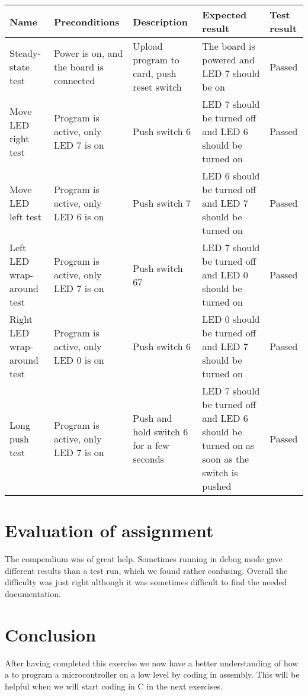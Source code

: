 \documentclass[a4paper,11pt]{article}
\begin{document}
\renewcommand{\arraystretch}{1.25} %
\begin{tabular}[pos]{|m{70pt}|m{90pt}|m{90pt}|m{100pt}|m{60pt}|}
\hline
\textbf{Name} 				& \textbf{Preconditions}				& \textbf{Description} 					& \textbf{Expected result} 													& \textbf{Test result} 		\\ \hline

Steady-state test			& Power is on, and the board is connected & Upload program to card, push reset switch 	& The board is powered and LED 7 should be on 									& Passed 				\\ \hline

Move LED right test			& Program is active, only LED 7 is on 		& Push switch 6						 	& LED 7 should be turned off and LED 6 should be turned on 							& Passed 				\\ \hline

Move LED left test			& Program is active, only LED 6 is on 		& Push switch 7						 	& LED 6 should be turned off and LED 7 should be turned on 							& Passed 				\\ \hline

Left LED wrap-around test		& Program is active, only LED 7 is on 		& Push switch 67					 	& LED 7 should be turned off and LED 0 should be turned on 							& Passed 				\\ \hline

Right LED wrap-around test	& Program is active, only LED 0 is on 		& Push switch 6						 	& LED 0 should be turned off and LED 7 should be turned on 							& Passed 				\\ \hline

Long push test				& Program is active, only LED 7 is on 		& Push and hold switch 6 for a few seconds 	& LED 7 should be turned off and LED 6 should be turned on as soon as the switch is pushed 	& Passed 				\\ \hline
\end{tabular}

\section{Evaluation of assignment}
The compendium was of great help. Sometimes running in debug mode gave different results than a test run, which we found rather confusing. Overall the difficulty was just right although it was sometimes difficult to find the needed documentation. 

\section{Conclusion}
After having completed this exercise we now have a better understanding of how a to program a microcontroller on a low level by coding in assembly. This will be helpful when we will start coding in C in the next exercises. 
\end{document}
